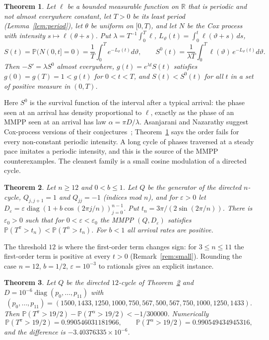 \documentclass[11pt]{amsart}
\newtheorem{theorem}{Theorem}[section]
\theoremstyle{remark}
\newcommand{\R}{\mathbb R}
\newcommand{\Pp}{\mathbb P}
\begin{document}
\begin{theorem}\label{thm:cox}
Let $\ell$ be a bounded measurable function on $\R$ that is periodic and not almost everywhere constant, let $T>0$ be its least period (Lemma~\ref{lem:period}), let $\theta$ be uniform on $[0,T)$, and let $N$ be the Cox process with intensity $s\mapsto\ell(\theta+s)$. Put $\lambda=T^{-1}\int_0^T\ell$, $L_\vartheta(t)=\int_0^t\ell(\vartheta+s)\,ds$,
\[
S(t)=\Pp(N(0,t]=0)=\frac1T\int_0^Te^{-L_\vartheta(t)}d\vartheta,\qquad S^0(t)=\frac1{\lambda T}\int_0^T\ell(\vartheta)\,e^{-L_\vartheta(t)}d\vartheta .
\]
Then $-S'=\lambda S^0$ almost everywhere, $g(t)=e^{\lambda t}S(t)$ satisfies $g(0)=g(T)=1<g(t)$ for $0<t<T$, and $S(t)<S^0(t)$ for all $t$ in a set of positive measure in $(0,T)$.
\end{theorem}

Here $S^0$ is the survival function of the interval after a typical arrival: the phase seen at an arrival has density proportional to $\ell$, exactly as the phase of an MMPP seen at an arrival has law $\alpha=\pi D/\lambda$. Asanjarani and Nazarathy suggest Cox-process versions of their conjectures~\cite[Section~4]{AN}; Theorem~\ref{thm:cox} says the order fails for every non-constant periodic intensity. A long cycle of phases traversed at a steady pace imitates a periodic intensity, and this is the source of the MMPP counterexamples. The cleanest family is a small cosine modulation of a directed cycle.

\begin{theorem}\label{thm:cycle}
Let $n\ge 12$ and $0<b\le1$. Let $Q$ be the generator of the directed $n$-cycle, $Q_{j,j+1}=1$ and $Q_{jj}=-1$ (indices mod $n$), and for $\varepsilon>0$ let $D_\varepsilon=\varepsilon\operatorname{diag}(1+b\cos(2\pi j/n))_{j=0}^{n-1}$. Put $t_n=3\pi/(2\sin(2\pi/n))$. There is $\varepsilon_0>0$ such that for $0<\varepsilon<\varepsilon_0$ the MMPP $(Q,D_\varepsilon)$ satisfies $\Pp(T^\pi>t_n)<\Pp(T^\alpha>t_n)$. For $b<1$ all arrival rates are positive.
\end{theorem}

The threshold $12$ is where the first-order term changes sign: for $3\le n\le 11$ the first-order term is positive at every $t>0$ (Remark~\ref{rem:small}). Rounding the case $n=12$, $b=1/2$, $\varepsilon=10^{-3}$ to rationals gives an explicit instance.

\begin{theorem}\label{thm:twelve}
Let $Q$ be the directed $12$-cycle of Theorem~\ref{thm:cycle} and $D=10^{-6}\operatorname{diag}(p_0,\dots,p_{11})$ with
\[
(p_0,\dots,p_{11})=(1500,1433,1250,1000,750,567,500,567,750,1000,1250,1433).
\]
Then $\Pp(T^\pi>19/2)-\Pp(T^\alpha>19/2)<-1/300000$. Numerically
\[
\Pp(T^\pi>19/2)=0.990546031181966,\qquad \Pp(T^\alpha>19/2)=0.990549434945316,
\]
and the difference is $-3.40376335\times10^{-6}$.
\end{theorem}
\end{document}
